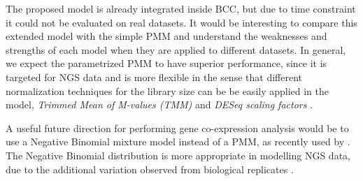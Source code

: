 The proposed model is already integrated inside BCC, but due to time constraint it could not be evaluated on real datasets. It would be interesting to compare this extended model with the simple PMM and understand the weaknesses and strengths of each model when they are applied to different datasets. In general, we expect the parametrized PMM to have superior performance, since it is targeted for NGS data and is more flexible in the sense that different normalization techniques for the library size can be be easily applied in the model, \eg \emph{Trimmed Mean of M-values (TMM)} \citep{Robinson2010} and \emph{DESeq scaling factors} \citep{Anders2010}. 

A useful future direction for performing gene co-expression analysis would be to use a Negative Binomial mixture model instead of a PMM, as recently used by \citet{Si2013}. The Negative Binomial distribution is more appropriate in modelling NGS data, due to the additional variation observed from biological replicates \citep{Robinson2007}.
